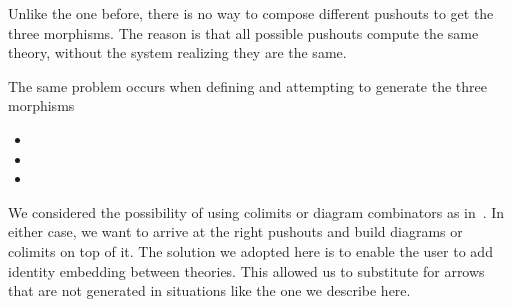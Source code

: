 Unlike the one before, there is no way to compose different pushouts to get the three morphisms. The reason is that all possible pushouts compute the same theory, without the system realizing they are the same. 

The same problem occurs when defining  and attempting to generate the three morphisms 
\begin{itemize}
    \item {}
    \item {}
    \item {}
\end{itemize}

We considered the possibility of using colimits or diagram combinators as in~\cite{cicm2019diagrams}. In either case, we want to arrive at the right pushouts and build diagrams or colimits on top of it. The solution we adopted here is to enable the user to add identity embedding between theories. This allowed us to substitute for arrows that are not generated in situations like the one we describe here. 

